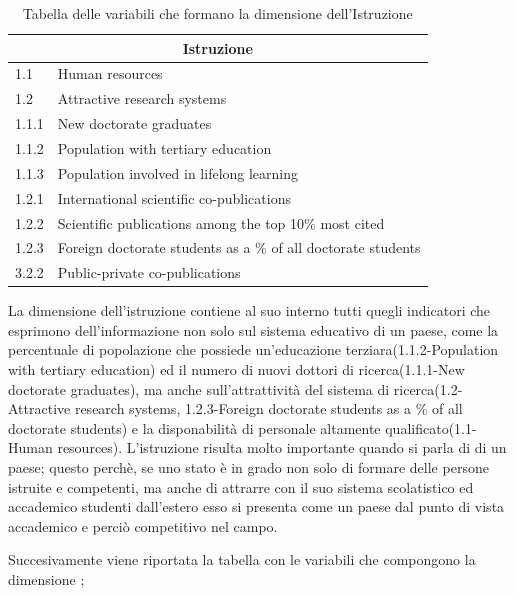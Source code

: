 \documentclass[a4paper,12pt, openright]{report}
\begin{document}
\begin{table}[h!]
    \centering
    \begin{tabular}{ |l|l| }
        \hline
        \multicolumn{2}{|c|}{\textbf{Istruzione}} \\
        \hline
        1.1 & Human resources\\
        \hline
        1.2 & Attractive research systems \\
        \hline
        1.1.1 & New doctorate graduates \\
        \hline
        1.1.2 & Population with tertiary education \\
        \hline
        1.1.3 & Population involved in lifelong learning \\
        \hline
        1.2.1 & International scientific co-publications \\
        \hline
        1.2.2 & Scientific publications among the top 10\% most cited  \\
        \hline
        1.2.3 & Foreign doctorate students as a \% of all doctorate students \\
        \hline
        3.2.2 & Public-private co-publications \\
        \hline
      \end{tabular}
      \caption{Tabella delle variabili che formano la dimensione dell'Istruzione}
    \label{table:1}
\end{table}

La dimensione dell'istruzione contiene al suo interno tutti quegli indicatori che esprimono dell'informazione non solo sul sistema educativo di un paese, come 
la percentuale di popolazione che possiede un'educazione terziara(1.1.2-Population with tertiary education) ed il numero di nuovi dottori di
ricerca(1.1.1-New doctorate graduates), ma anche sull'attrattività del sistema di ricerca(1.2-Attractive research systems, 1.2.3-Foreign doctorate students as a \% of all doctorate students)
e la disponabilità di personale altamente qualificato(1.1-Human resources). L'istruzione risulta molto importante quando si parla di 
 di un paese; questo perchè, se uno stato è in grado non solo di formare delle persone istruite e competenti, ma anche di 
attrarre con il suo sistema scolatistico ed accademico studenti dall'estero esso si presenta come un paese  dal punto di vista
accademico e perciò competitivo nel campo.\\

\newpage

Succesivamente viene riportata la tabella con le variabili che compongono la dimensione ;\\
\end{document}
